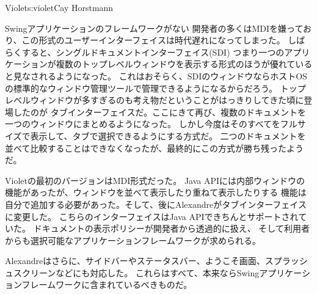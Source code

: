 \begin{aosachapter}{Violet}{s:violet}{Cay Horstmann}
\begin{aosasect1}{Swingアプリケーションのフレームワークがない}
開発者の多くはMDIを嫌っており、この形式のユーザーインターフェイスは時代遅れになってしまった。
しばらくすると、シングルドキュメントインターフェイス(SDI)
つまり一つのアプリケーションが複数のトップレベルウィンドウを表示する形式のほうが優れていると見なされるようになった。
これはおそらく、SDIのウィンドウならホストOSの標準的なウィンドウ管理ツールで管理できるようになるからだろう。
トップレベルウィンドウが多すぎるのも考え物だということがはっきりしてきた頃に登場したのが
タブインターフェイスだ。ここにきて再び、複数のドキュメントを一つのウィンドウにまとめるようになった。
しかし今度はそのすべてをフルサイズで表示して、タブで選択できるようにする方式だ。
二つのドキュメントを並べて比較することはできなくなったが、最終的にこの方式が勝ち残ったようだ。

Violetの最初のバージョンはMDI形式だった。
Java APIには内部ウィンドウの機能があったが、ウィンドウを並べて表示したり重ねて表示したりする
機能は自分で追加する必要があった。そして、後にAlexandreがタブインターフェイスに変更した。
こちらのインターフェイスはJava APIできちんとサポートされていた。
ドキュメントの表示ポリシーが開発者から透過的に扱え、
そして利用者からも選択可能なアプリケーションフレームワークが求められる。

Alexandreはさらに、サイドバーやステータスバー、ようこそ画面、スプラッシュスクリーンなどにも対応した。
これらはすべて、本来ならSwingアプリケーションフレームワークに含まれているべきものだ。


\end{aosasect1}
\end{aosachapter}
